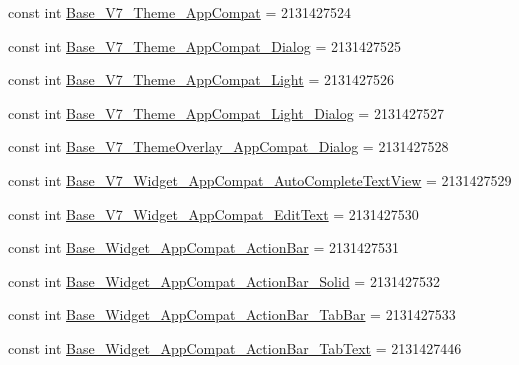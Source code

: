 \begin{DoxyCompactItemize}
\item 
const int \mbox{\hyperlink{class_f_w_p_s___app_1_1_droid_1_1_resource_1_1_style_ab329e1b91270acfba115c1de504a4d40}{Base\+\_\+\+V7\+\_\+\+Theme\+\_\+\+App\+Compat}} = 2131427524
\item 
const int \mbox{\hyperlink{class_f_w_p_s___app_1_1_droid_1_1_resource_1_1_style_a0ca8c0b3cc4f6aede9a791048c33727a}{Base\+\_\+\+V7\+\_\+\+Theme\+\_\+\+App\+Compat\+\_\+\+Dialog}} = 2131427525
\item 
const int \mbox{\hyperlink{class_f_w_p_s___app_1_1_droid_1_1_resource_1_1_style_afaf2fe71a2ab8b75a71bad730aa8d875}{Base\+\_\+\+V7\+\_\+\+Theme\+\_\+\+App\+Compat\+\_\+\+Light}} = 2131427526
\item 
const int \mbox{\hyperlink{class_f_w_p_s___app_1_1_droid_1_1_resource_1_1_style_aa86b297f2032cfaa31977ea14c15f9ce}{Base\+\_\+\+V7\+\_\+\+Theme\+\_\+\+App\+Compat\+\_\+\+Light\+\_\+\+Dialog}} = 2131427527
\item 
const int \mbox{\hyperlink{class_f_w_p_s___app_1_1_droid_1_1_resource_1_1_style_a833d2549390c7965169665b9847d5820}{Base\+\_\+\+V7\+\_\+\+Theme\+Overlay\+\_\+\+App\+Compat\+\_\+\+Dialog}} = 2131427528
\item 
const int \mbox{\hyperlink{class_f_w_p_s___app_1_1_droid_1_1_resource_1_1_style_a81a341eebbbcf4a9718a812209a42391}{Base\+\_\+\+V7\+\_\+\+Widget\+\_\+\+App\+Compat\+\_\+\+Auto\+Complete\+Text\+View}} = 2131427529
\item 
const int \mbox{\hyperlink{class_f_w_p_s___app_1_1_droid_1_1_resource_1_1_style_a79b8b0de1230a8fddc6276f8cb48c125}{Base\+\_\+\+V7\+\_\+\+Widget\+\_\+\+App\+Compat\+\_\+\+Edit\+Text}} = 2131427530
\item 
const int \mbox{\hyperlink{class_f_w_p_s___app_1_1_droid_1_1_resource_1_1_style_aa034e88b9ddf3f2c54a0d4da1fe41389}{Base\+\_\+\+Widget\+\_\+\+App\+Compat\+\_\+\+Action\+Bar}} = 2131427531
\item 
const int \mbox{\hyperlink{class_f_w_p_s___app_1_1_droid_1_1_resource_1_1_style_a97e59eb82b62e08de4356c81094cb8ec}{Base\+\_\+\+Widget\+\_\+\+App\+Compat\+\_\+\+Action\+Bar\+\_\+\+Solid}} = 2131427532
\item 
const int \mbox{\hyperlink{class_f_w_p_s___app_1_1_droid_1_1_resource_1_1_style_ab84db8f6762b25b287478ac0e2954349}{Base\+\_\+\+Widget\+\_\+\+App\+Compat\+\_\+\+Action\+Bar\+\_\+\+Tab\+Bar}} = 2131427533
\item 
const int \mbox{\hyperlink{class_f_w_p_s___app_1_1_droid_1_1_resource_1_1_style_aaf15ecae443a61dc4a4da230fdd678a9}{Base\+\_\+\+Widget\+\_\+\+App\+Compat\+\_\+\+Action\+Bar\+\_\+\+Tab\+Text}} = 2131427446

\end{DoxyCompactItemize}

